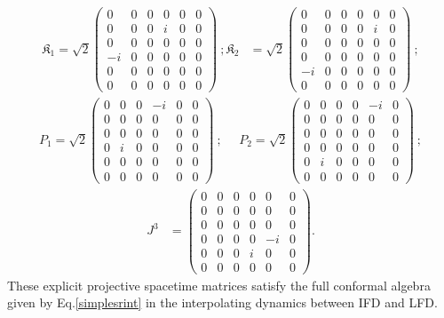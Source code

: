 \documentclass[foundations,article,submit,pdftex,moreauthors]{Definitions/mdpi}
\begin{document}
    \begin{align}
        \mathfrak{K}_1=\sqrt{2}\begin{pmatrix}
    0&0&0&0&0&0\\
    0&0&0&i&0&0\\
    0&0&0&0&0&0\\
    -i&0&0&0&0&0\\
    0&0&0&0&0&0\\
    0&0&0&0&0&0
    \end{pmatrix}~;
    \mathfrak{K}_2&=\sqrt{2}\begin{pmatrix}
    0&0&0&0&0&0\\
    0&0&0&0&i&0\\
    0&0&0&0&0&0\\
    0&0&0&0&0&0\\
    -i&0&0&0&0&0\\
    0&0&0&0&0&0
    \end{pmatrix}~;\nonumber
    \end{align}
    \begin{align}
        P_1=\sqrt{2}\begin{pmatrix}
    0&0&0&-i&0&0\\
    0&0&0&0&0&0\\
    0&0&0&0&0&0\\
    0&i&0&0&0&0\\
    0&0&0&0&0&0\\
    0&0&0&0&0&0
    \end{pmatrix}~;~~~~~~
    P_2=\sqrt{2}\begin{pmatrix}
    0&0&0&0&-i&0\\
    0&0&0&0&0&0\\
    0&0&0&0&0&0\\
    0&0&0&0&0&0\\
    0&i&0&0&0&0\\
    0&0&0&0&0&0
    \end{pmatrix}~;\nonumber
    \end{align}
    \begin{align}
        J^3&=\begin{pmatrix}
    0&0&0&0&0&0\\
    0&0&0&0&0&0\\
    0&0&0&0&0&0\\
  0&0&0&0 & -i & 0\\
  0&0&0&i & 0 & 0\\
  0&0&0&0 & 0 & 0
\end{pmatrix}.\label{matrix-rep-conformal-generators}
    \end{align}
%
These explicit projective spacetime matrices satisfy the full conformal algebra given by Eq.\eqref{simplesrint} in the  interpolating dynamics between IFD and LFD. 
\end{document}
